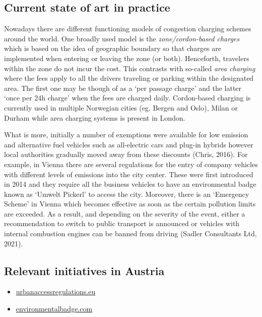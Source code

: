 \documentclass[
]{book}
\providecommand{\tightlist}{%
  \setlength{\itemsep}{0pt}\setlength{\parskip}{0pt}}
\begin{document}
\hypertarget{current-state-of-art-in-practice-6}{%
\subsection*{Current state of art in practice}\label{current-state-of-art-in-practice-6}}

Nowadays there are different functioning models of congestion charging schemes around the world. One broadly used model is the \emph{zone/cordon-based charges} which is based on the idea of geographic boundary so that charges are implemented when entering or leaving the zone (or both). Henceforth, travelers within the zone do not incur the cost. This contrasts with so-called \emph{area charging} where the fees apply to all the drivers traveling or parking within the designated area. The first one may be though of as a `per passage charge' and the latter `once per 24h charge' when the fees are charged daily. Cordon-based charging is currently used in multiple Norwegian cities (eg. Bergen and Oslo), Milan or Durham while area charging systems is present in London.

What is more, initially a number of exemptions were available for low emission and alternative fuel vehicles such as all-electric cars and plug-in hybrids however local authorities gradually moved away from these discounts (Chris, 2016). For example, in Vienna there are several regulations for the entry of company vehicles with different levels of emissions into the city center. These were first introduced in 2014 and they require all the business vehicles to have an environmental badge known as `Umwelt Pickerl' to access the city. Moreover, there is an `Emergency Scheme' in Vienna which becomes effective as soon as the certain pollution limits are exceeded. As a result, and depending on the severity of the event, either a recommendation to switch to public transport is announced or vehicles with internal combustion engines can be banned from driving (Sadler Consultants Ltd, 2021).

\hypertarget{relevant-initiatives-in-austria-6}{%
\subsection*{Relevant initiatives in Austria}\label{relevant-initiatives-in-austria-6}}

\begin{itemize}
\tightlist
\item
  \href{https://urbanaccessregulations.eu/countries-mainmenu-147/austria-mainmenu-78/wien-vienna}{urbanaccessregulations.eu}
\item
  \href{https://www.environmentalbadge.com/environmental-zone-vienna/}{environmentalbadge.com}
\end{itemize}
\end{document}
